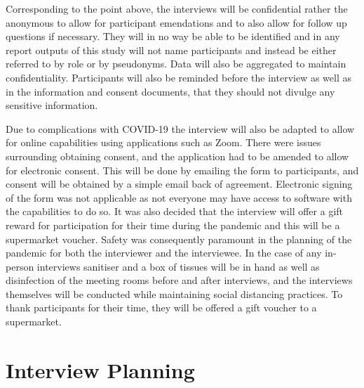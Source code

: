 \newline
\par Corresponding to the point above, the interviews will be confidential rather the anonymous to allow for participant emendations and to also allow for follow up questions if necessary. They will in no way be able to be identified and in any report outputs of this study will not name participants and instead be either referred to by role or by pseudonyms. Data will also be aggregated to maintain confidentiality. Participants will also be reminded before the interview as well as in the information and consent documents, that they should not divulge any sensitive information. 
\newline
\par Due to complications with COVID-19 the interview will also be adapted to allow for online capabilities using applications such as Zoom. There were issues surrounding obtaining consent, and the application had to be amended to allow for electronic consent. This will be done by emailing the form to participants, and consent will be obtained by a simple email back of agreement. Electronic signing of the form was not applicable as not everyone may have access to software with the capabilities to do so. It was also decided that the interview will offer a gift reward for participation for their time during the pandemic and this will be a supermarket voucher. Safety was consequently paramount in the planning of the pandemic for both the interviewer and the interviewee. In the case of any in-person interviews sanitiser and a box of tissues will be in hand as well as disinfection of the meeting rooms before and after interviews, and the interviews themselves will be conducted while maintaining social distancing practices. To thank participants for their time, they will be offered a gift voucher to a supermarket.



\section{Interview Planning}

